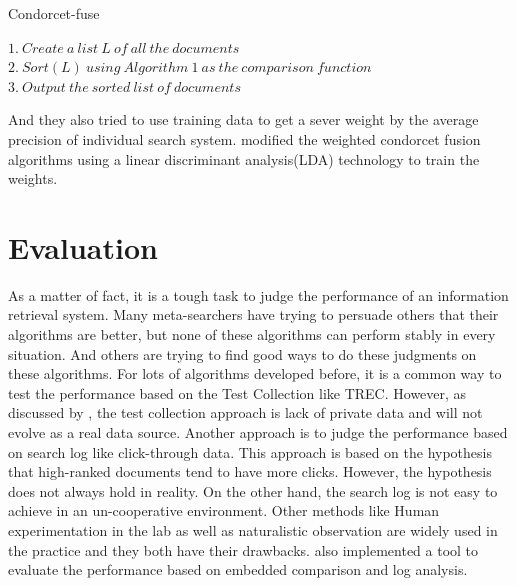 \begin{algorithm}
\caption{Condorcet-fuse}
\label{ag:cf}
\begin{algorithmic}
\State $1.\ Create\ a\ list\ L\ of\ all\ the\ documents$
\State $2.\ Sort(L)\ using\ Algorithm\ 1\ as\ the\ comparison\ function$
\State $3.\ Output\ the\ sorted\ list\ of\ documents$
\end{algorithmic}
\end{algorithm}
And they also tried to use training data to get a sever weight by the average precision of individual search system. \cite{Wu2013} modified the weighted condorcet fusion algorithms using a linear discriminant analysis(LDA) technology to train the weights.

\section{Evaluation} As a matter of fact, it is a tough task to judge the performance of an information retrieval system. Many meta-searchers have trying to persuade others that their algorithms are better, but none of these algorithms can perform stably in every situation. And others are trying to find good ways to do these judgments on these algorithms. For lots of algorithms developed before, it is a common way to test the performance based on the Test Collection like TREC\cite{Voorhees2005}. However, as discussed by \cite{Thomas2006}, the test collection approach is lack of private data and will not evolve as a real data source. Another approach is to judge the performance based on search log like click-through data. This approach is based on the hypothesis that high-ranked documents tend to have more clicks. However, the hypothesis does not always hold in reality. On the other hand, the search log is not easy to achieve in an un-cooperative environment. Other methods like Human experimentation in the lab as well as naturalistic observation are widely used in the practice and they both have their drawbacks. \cite{Thomas2006} also implemented a tool to evaluate the performance based on embedded comparison and log analysis.

